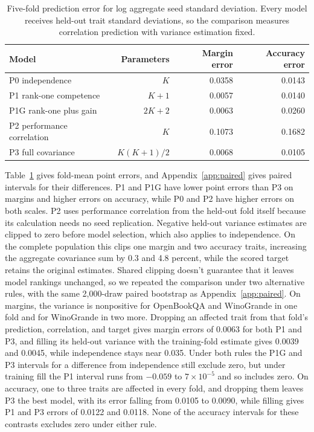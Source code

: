 \begin{table}[!htb]
\centering
\caption{Five-fold prediction error for log aggregate seed standard deviation. Every model receives held-out trait standard deviations, so the comparison measures correlation prediction with variance estimation fixed.}
\label{tab:original11}
\small\setlength{\tabcolsep}{4pt}\renewcommand{\arraystretch}{1.12}
\begin{tabular}{lrrr}\toprule
Model & Parameters & Margin error & Accuracy error\\\midrule
P0 independence & $K$ & 0.0358 & 0.0143\\
P1 rank-one competence & $K+1$ & 0.0057 & 0.0140\\
P1G rank-one plus gain & $2K+2$ & 0.0063 & 0.0260\\
P2 performance correlation & $K$ & 0.1073 & 0.1682\\
P3 full covariance & $K(K+1)/2$ & 0.0068 & 0.0105\\\bottomrule
\end{tabular}
\end{table}

Table~\ref{tab:original11} gives fold-mean point errors, and Appendix~\ref{app:paired} gives paired intervals for their differences. P1 and P1G have lower point errors than P3 on margins and higher errors on accuracy, while P0 and P2 have higher errors on both scales. P2 uses performance correlation from the held-out fold itself because its calculation needs no seed replication. Negative held-out variance estimates are clipped to zero before model selection, which also applies to independence. On the complete population this clips one margin and two accuracy traits, increasing the aggregate covariance sum by 0.3 and 4.8 percent, while the scored target retains the original estimates. Shared clipping doesn't guarantee that it leaves model rankings unchanged, so we repeated the comparison under two alternative rules, with the same 2,000-draw paired bootstrap as Appendix~\ref{app:paired}. On margins, the variance is nonpositive for OpenBookQA and WinoGrande in one fold and for WinoGrande in two more. Dropping an affected trait from that fold's prediction, correlation, and target gives margin errors of 0.0063 for both P1 and P3, and filling its held-out variance with the training-fold estimate gives 0.0039 and 0.0045, while independence stays near 0.035. Under both rules the P1G and P3 intervals for a difference from independence still exclude zero, but under training fill the P1 interval runs from $-0.059$ to $7\times10^{-5}$ and so includes zero. On accuracy, one to three traits are affected in every fold, and dropping them leaves P3 the best model, with its error falling from 0.0105 to 0.0090, while filling gives P1 and P3 errors of 0.0122 and 0.0118. None of the accuracy intervals for these contrasts excludes zero under either rule.

